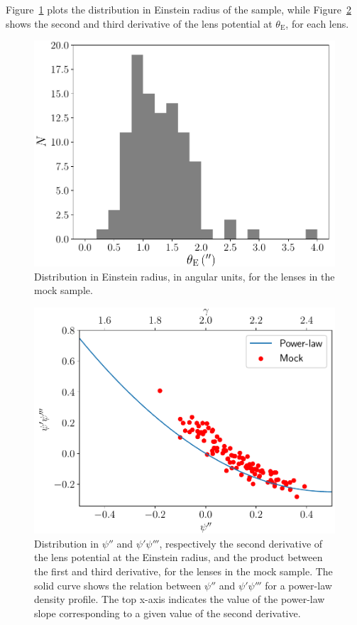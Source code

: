 \documentclass[usenatbib]{mnras}
\def\psii{\psi'}
\def\psiii{\psi''}
\def\psiiii{\psi'''}
\def\tein{\theta_{\mathrm{E}}}
\def\Fref#1{Figure~\ref{#1}\xspace}
\begin{document}
\Fref{fig:rein} plots the distribution in Einstein radius of the sample, while \Fref{fig:psi} shows the second and third derivative of the lens potential at $\tein$, for each lens.
%
\begin{figure}
 \includegraphics[width=\columnwidth]{rein_hist-eps-converted-to.pdf}
 \caption{Distribution in Einstein radius, in angular units, for the lenses in the mock sample.}
 \label{fig:rein}
\end{figure}
%
%
\begin{figure}
 \includegraphics[width=\columnwidth]{psi_plot-eps-converted-to.pdf}
 \caption{Distribution in $\psiii$ and $\psii\psiiii$, respectively the second derivative of the lens potential at the Einstein radius, and the product between the first and third derivative, for the lenses in the mock sample.
The solid curve shows the relation between $\psiii$ and $\psii\psiiii$ for a power-law density profile. The top x-axis indicates the value of the power-law slope corresponding to a given value of the second derivative.
}
 \label{fig:psi}
\end{figure}
\end{document}
